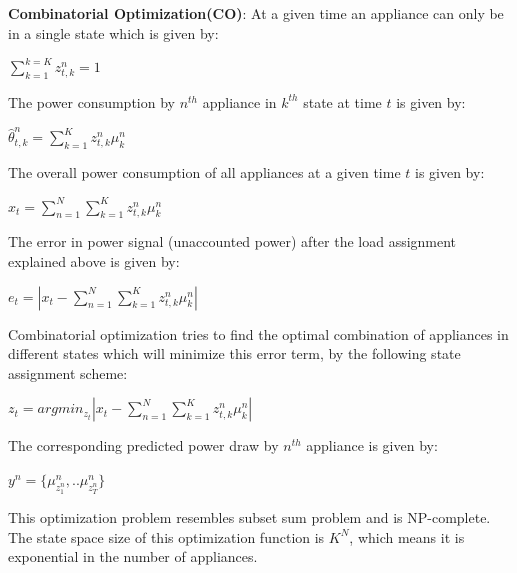 \documentclass[conference]{IEEEtran}
\begin{document}
\begin{table}[ht!]
\begin{tabular}{|l|l|}
                             
                                                                               

\hline
%
\end{tabular}
\end{table}

\noindent \textbf{Combinatorial Optimization(CO)}: At a given time an appliance can only be in a single state which is given by:

$\sum\limits_{k=1}^{k=K} z_{t,k}^n=1$ 

\noindent The power consumption by $n^{th}$ appliance in $k^{th}$ state at time $t$ is given by:

$\hat{\theta}^n_{t,k}=\sum\limits_{k=1}^{K} z_{t,k}^n \mu_k^n$

\noindent The overall power consumption of all appliances at a given time $t$ is given by:

$\hat{x}_{t}=\sum\limits_{n=1}^{N}\sum\limits_{k=1}^{K} z_{t,k}^n \mu_k^n$

\noindent The error in power signal (unaccounted power) after the load assignment explained above is given by:

$e_t=|x_t-\sum\limits_{n=1}^{N}\sum\limits_{k=1}^{K}z_{t,k}^n\mu_k^n|$

\noindent Combinatorial optimization tries to find the optimal combination of appliances in different states which will minimize this error term, by the following state assignment scheme:

$z_t=arg min_{z_t}|x_t-\sum\limits_{n=1}^{N}\sum\limits_{k=1}^{K}z_{t,k}^n\mu_k^n|$

\noindent The corresponding predicted power draw by $n^{th}$ appliance is given by:

$y^n=\{\mu_{z_1^n}^n,..\mu_{z_T^n}^n \}$

\noindent This optimization problem resembles subset sum problem \cite{knapsack} and is NP-complete. The state space size of this optimization function is $K^N$, which means it is exponential in the number of appliances. 
\end{document}

